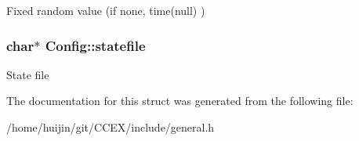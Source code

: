 Fixed random value (if none, time(null) ) \hypertarget{structConfig_a7ce40e0c9e172e7b2e213101b154760b}{
\subsubsection[{statefile}]{\setlength{\rightskip}{0pt plus 5cm}char$\ast$ Config\-::statefile}}\label{structConfig_a7ce40e0c9e172e7b2e213101b154760b}
State file 

The documentation for this struct was generated from the following file\-:\begin{DoxyCompactItemize}
\item 
/home/huijin/git/\-C\-C\-E\-X/include/general.\-h\end{DoxyCompactItemize}
